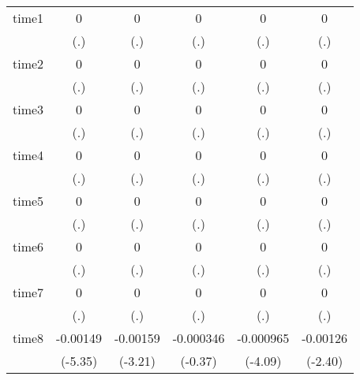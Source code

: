 \begin{table}[htbp]
\begin{tabular}{l*{5}{c}}
time1       &           0         &           0         &           0         &           0         &           0         \\
            &         (.)         &         (.)         &         (.)         &         (.)         &         (.)         \\
time2       &           0         &           0         &           0         &           0         &           0         \\
            &         (.)         &         (.)         &         (.)         &         (.)         &         (.)         \\
time3       &           0         &           0         &           0         &           0         &           0         \\
            &         (.)         &         (.)         &         (.)         &         (.)         &         (.)         \\
time4       &           0         &           0         &           0         &           0         &           0         \\
            &         (.)         &         (.)         &         (.)         &         (.)         &         (.)         \\
time5       &           0         &           0         &           0         &           0         &           0         \\
            &         (.)         &         (.)         &         (.)         &         (.)         &         (.)         \\
time6       &           0         &           0         &           0         &           0         &           0         \\
            &         (.)         &         (.)         &         (.)         &         (.)         &         (.)         \\
time7       &           0         &           0         &           0         &           0         &           0         \\
            &         (.)         &         (.)         &         (.)         &         (.)         &         (.)         \\
time8       &    -0.00149\sym{***}&    -0.00159\sym{**} &   -0.000346         &   -0.000965\sym{***}&    -0.00126\sym{*}  \\
            &     (-5.35)         &     (-3.21)         &     (-0.37)         &     (-4.09)         &     (-2.40)         \\

\end{tabular}
\end{table}
